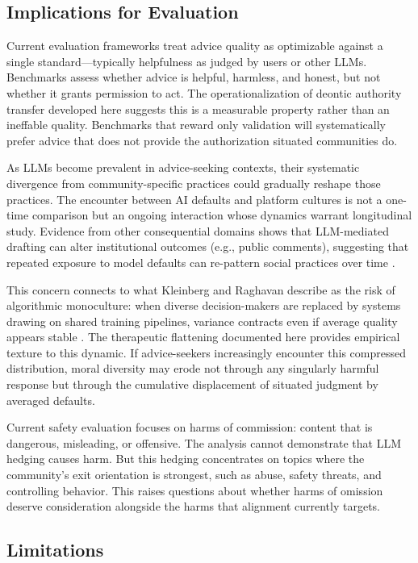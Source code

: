 \subsection{Implications for Evaluation}

Current evaluation frameworks treat advice quality as optimizable against a single standard---typically helpfulness as judged by users or other LLMs. Benchmarks assess whether advice is helpful, harmless, and honest, but not whether it grants permission to act. The operationalization of deontic authority transfer developed here suggests this is a measurable property rather than an ineffable quality. Benchmarks that reward only validation will systematically prefer advice that does not provide the authorization situated communities do. 

As LLMs become prevalent in advice-seeking contexts, their systematic divergence from community-specific practices could gradually reshape those practices. The encounter between AI defaults and platform cultures is not a one-time comparison but an ongoing interaction whose dynamics warrant longitudinal study. Evidence from other consequential domains shows that LLM-mediated drafting can alter institutional outcomes (e.g., public comments), suggesting that repeated exposure to model defaults can re-pattern social practices over time \citep{arsenault2026whose}.

This concern connects to what Kleinberg and Raghavan describe as the risk of algorithmic monoculture: when diverse decision-makers are replaced by systems drawing on shared training pipelines, variance contracts even if average quality appears stable \cite{kleinberg2021algorithmic}. The therapeutic flattening documented here provides empirical texture to this dynamic. If advice-seekers increasingly encounter this compressed distribution, moral diversity may erode not through any singularly harmful response but through the cumulative displacement of situated judgment by averaged defaults.

Current safety evaluation focuses on harms of commission: content that is dangerous, misleading, or offensive. The analysis cannot demonstrate that LLM hedging causes harm. But this hedging concentrates on topics where the community's exit orientation is strongest, such as abuse, safety threats, and controlling behavior. This raises questions about whether harms of omission deserve consideration alongside the harms that alignment currently targets.

\subsection{Limitations}

